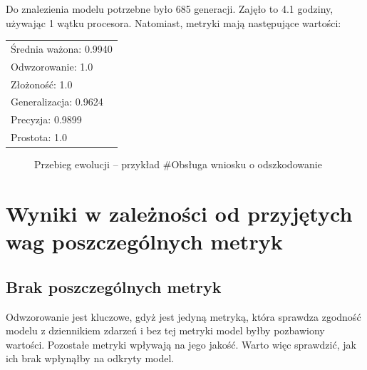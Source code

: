 Do znalezienia modelu potrzebne było 685 generacji. Zajęło to 4.1 godziny, używając 1 wątku procesora. Natomiast, metryki mają następujące wartości: 

 \begin{center}
  \begin{tabular}{l}
	Średnia ważona: 0.9940 \\
	Odwzorowanie: 1.0 \\
	Złożoność: 1.0 \\
	Generalizacja: 0.9624 \\
	Precyzja: 0.9899 \\
	Prostota: 1.0
  \end{tabular}
 \end{center}
 
\begin{figure}[H]
	\caption{\label{fig:p5_chart}Przebieg ewolucji -- przykład \#Obsługa wniosku o odszkodowanie}
\end{figure}

\section{Wyniki w zależności od przyjętych wag poszczególnych metryk}

\subsection{Brak poszczególnych metryk}
Odwzorowanie jest kluczowe, gdyż jest jedyną metryką, która sprawdza zgodność modelu z dziennikiem zdarzeń i bez tej metryki model byłby pozbawiony wartości. Pozostałe metryki wpływają na jego jakość. Warto więc sprawdzić, jak ich brak wpłynąłby na odkryty model.

